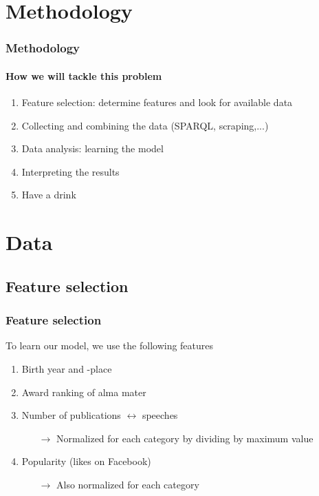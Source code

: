 \documentclass[nonav,sleutel]{beamer}
\begin{document}
\section{Methodology}
\begin{frame}
\frametitle{Methodology}
\framesubtitle{How we will tackle this problem}
\begin{enumerate}
\item<1-> Feature selection: determine features and look for available data
\item<2-> Collecting and combining the data (SPARQL, scraping,...)
\item<3-> Data analysis: learning the model
\item<4-> Interpreting the results
\item<5-> Have a drink
\end{enumerate}
\end{frame}

\section{Data}

\subsection{Feature selection}
\begin{frame}
\frametitle{Feature selection}
To learn our model, we use the following features\\[.5cm]
\begin{enumerate}
\item<1-> Birth year and -place
\item<2-> Award ranking of alma mater
\item<3-> Number of publications $\leftrightarrow$ speeches
	\begin{itemize}
		\item[$\rightarrow$] Normalized for each category by dividing by maximum value 
	\end{itemize}
\item<4-> Popularity (likes on Facebook)
	\begin{itemize}
		\item[$\rightarrow$] Also normalized for each category
	\end{itemize}
\setcounter{featureCounter}{\theenumi}
\end{enumerate}
\vspace{.5cm}
\end{frame}
\end{document}
